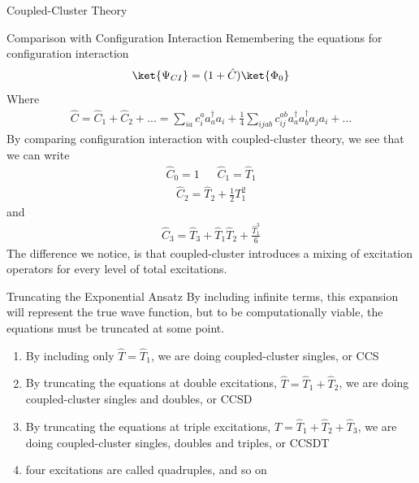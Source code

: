 \documentclass[twoside,english]{uiofysmaster}
\begin{document}
\begin{chapter}{Coupled-Cluster Theory}
\begin{section}{Comparison with Configuration Interaction}
	  	Remembering the equations for configuration interaction
	  	\begin{align}
	  		\ket{\Psi_{CI}} = (1 + \hat C) \ket{\Phi_0} 
	   	\end{align}
	   	Where
	  	\begin{align}
	  		\hat C = \hat C_1 + \hat C_2 + ... =  \sum_{ia} c_i^a a_a^{\dagger} a_i + \frac{1}{4} \sum_{ijab} c_{ij}^{ab} a_a^{\dagger} a_b^{\dagger} a_j a_i + ...
	   	\end{align}
	   	By comparing configuration interaction with coupled-cluster theory, we see that we can write
	   	\begin{align}
	   		\hat C_0 = 1 \:\:\:\:\:\:\: \hat C_1 = \hat T_1 
	   	\end{align}
	   	\begin{align}
	   		\hat C_2 = \hat T_2 + \frac{1}{2} T_1^2
	   	\end{align}
	   	and 
	   	\begin{align}
	   		\hat C_3 = \hat T_3 + \hat T_1 \hat T_2 + \frac{\hat T_1^3}{6}
	   	\end{align}
	   	The difference we notice, is that coupled-cluster introduces a mixing of excitation operators for every level of total excitations. 
 	\end{section}

	\begin{section}{Truncating the Exponential Ansatz}
	  	By including infinite terms, this expansion will represent the true wave function, but to be computationally viable, the equations must be truncated at some point. 
	  	\begin{enumerate}
	  		\item By including only $\hat T = \hat T_1$, we are doing coupled-cluster singles, or CCS
	  		\item By truncating the equations at double excitations, $\hat T = \hat T_1 + \hat T_2$, we are doing coupled-cluster singles and doubles, or CCSD
	  		\item By truncating the equations at triple excitations, $\hat T = \hat T_1 + \hat T_2 + \hat T_3$, we are doing coupled-cluster singles, doubles and 		triples, or CCSDT 
	  		\item four excitations are called quadruples, and so on
	  	\end{enumerate}


\end{section}
\end{chapter}
\end{document}
